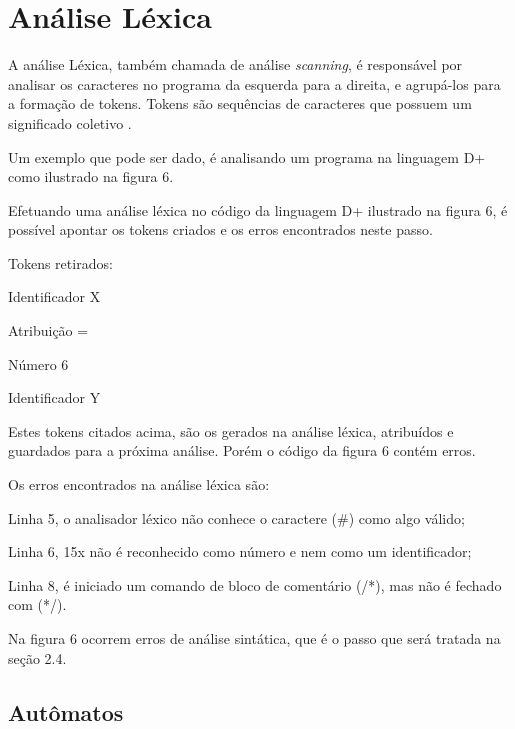 \documentclass[12pt,oneside,a4paper,chapter=TITLE,section=TITLE,sumario=tradicional]{abntex2}
\begin{document}
\section{Análise Léxica}
\label{sec:analise-lexica}

A análise Léxica, também chamada de análise \textit{scanning}, é responsável por analisar os caracteres no programa da esquerda para a direita, e agrupá-los para a formação de tokens. Tokens são sequências de caracteres que possuem um significado coletivo \cite{alfred1995}.

Um exemplo que pode ser dado, é analisando um programa na linguagem D+ como ilustrado na figura 6.

\begin{figure}[htb]
\end{figure}

Efetuando uma análise léxica no código da linguagem D+  ilustrado na figura 6, é possível apontar os tokens criados e os erros encontrados neste passo. 

Tokens retirados:

\begin{lista}
	\item Identificador    X 
	\item Atribuição        = 
	\item Número            6 
	\item Identificador    Y
\end{lista}

Estes tokens citados acima, são os gerados na análise léxica, atribuídos e guardados para a próxima análise. Porém o código da figura 6 contém erros.

Os erros encontrados na análise léxica são:

\begin{lista}
	\item Linha 5, o analisador léxico não conhece o caractere (\#) como algo válido;
	\item Linha 6, 15x não é reconhecido como número e nem como um identificador;
	\item Linha 8, é iniciado um comando de bloco de comentário (/*), mas não é fechado com (*/).
\end{lista}

Na figura 6 ocorrem erros de análise sintática, que é o passo que será tratada na seção 2.4.

\subsection{Autômatos}
\label{sec:automatos}
\end{document}
